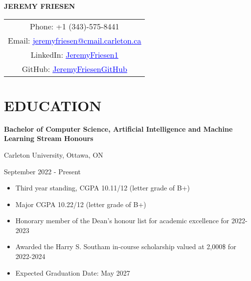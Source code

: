 \documentclass[a4paper,11pt]{article}
\begin{document}

\begin{center}
    {\Large\bfseries JEREMY FRIESEN}
\end{center}

\begin{center}
    \begin{tabular}{c}
        Phone: +1 (343)-575-8441 \\
        Email: \href{mailto:jeremyfriesen@cmail.carleton.ca}{\textcolor{blue}{\uline{jeremyfriesen@cmail.carleton.ca}}} \\
        LinkedIn: \href{https://www.linkedin.com/in/jeremyfriesen1/}{\textcolor{blue}{\uline{JeremyFriesen1}}} \\
        GitHub: \href{https://github.com/JeremyFriesenGitHub}{\textcolor{blue}{\uline{JeremyFriesenGitHub}}}
    \end{tabular}
\end{center}

\section{EDUCATION}
 \begin{minipage}{\linewidth}
    \textbf{Bachelor of Computer Science, Artificial Intelligence and Machine Learning Stream Honours}
\end{minipage}
    \begin{minipage}{.65\linewidth}
    \begin{flushleft}
        Carleton University, Ottawa, ON
    \end{flushleft}
\end{minipage}
\hfill
\begin{minipage}{.30\linewidth}
    \begin{flushright}
        September 2022 - Present
    \end{flushright}
\end{minipage}
\begin{itemize}
    \item Third year standing, CGPA 10.11/12 (letter grade of B+) 
    \item Major CGPA 10.22/12 (letter grade of B+)
    \item Honorary member of the Dean’s honour list for academic excellence for 2022-2023
    \item Awarded the Harry S. Southam in-course scholarship valued at 2,000\$ for 2022-2024 
    \item Expected Graduation Date: May 2027 
\end{itemize}
\end{document}
